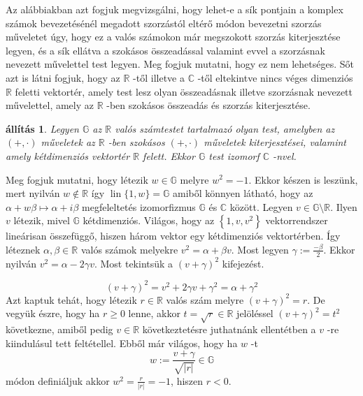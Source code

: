\documentclass[9pt, showtrims]{memoir}
\makeatletter
\renewenvironment{proof}[1][\proofname]
    {\par\pushQED{\qed}%
    \normalfont \topsep6\p@\@plus6\p@\relax
    \trivlist
    \item[\hskip\labelsep
        \itshape
    #1\@addpunct{:}]\ignorespaces}
    {\popQED\endtrivlist\@endpefalse}
\theoremstyle{plain}
\newtheorem{proposition}{állítás}[section]
\theoremstyle{remark}
\theoremstyle{definition}
\makeatother
\begin{document}
Az alábbiakban azt fogjuk megvizsgálni, hogy lehet-e a sík pontjain
a komplex számok bevezetésénél megadott szorzástól eltérő
módon bevezetni szorzás műveletet úgy, hogy ez a valós számokon
már megszokott szorzás kiterjesztése legyen, és a sík ellátva
a szokásos összeadással valamint evvel a szorzásnak nevezett művelettel test legyen.
Meg fogjuk mutatni, hogy ez nem lehetséges.
Sőt
azt is látni fogjuk, hogy az $\mathbb{R}$ -től illetve a $\mathbb{C}$ -től
eltekintve nincs véges dimenziós $\mathbb{R}$ feletti vektortér, amely
test lesz olyan összeadásnak illetve szorzásnak nevezett művelettel, 
amely az $\mathbb{R}$ -ben szokásos összeadás és szorzás kiterjesztése.

\begin{proposition}
\label{Th:CUnique1}Legyen $\mathbb{G}$ az $\mathbb{R}$ valós számtestet
tartalmazó olyan test, amelyben az $\left( +,\cdot \right) $ műveletek az $\mathbb{R}$ -ben szokásos $\left( +,\cdot \right) $ műveletek kiterjesztései, valamint amely kétdimenziós vektortér $\mathbb{R}$ felett.
Ekkor $\mathbb{G}$ test izomorf $\mathbb{C}$ -nvel.
\end{proposition}

\begin{proof}
Meg fogjuk mutatni, hogy létezik $w\in \mathbb{G}$ melyre $w^{2}=-1$.
Ekkor
készen is leszünk, mert nyilván $w\notin \mathbb{R}$ így $\operatorname{lin}\{1,w\}=\mathbb{G}$ amiből könnyen látható, hogy
az $\alpha +w\beta \longmapsto \alpha +i\beta $ megfeleltetés
izomorfizmus $\mathbb{G}$ és $\mathbb{C}$ között.
\newline
Legyen $v\in \mathbb{G}\setminus \mathbb{R}$.
Ilyen $v$ létezik, mivel $\mathbb{G}
$ kétdimenziós.
Világos, hogy az $\left\{
1,v,v^{2}\right\} $ vektorrendszer lineárisan összefüggő,
hiszen három vektor egy kétdimenziós vektortérben.
\'{I}gy léteznek $\alpha ,\beta \in \mathbb{R}$ valós számok melyekre $v^{2}=\alpha +\beta v$.
Most legyen $\gamma :=\frac{-\beta }{2}
$.
Ekkor nyilván $v^{2}=\alpha -2\gamma v$.
Most tekintsük a $\left(
v+\gamma \right) ^{2}$ kifejezést.

\[
\left( v+\gamma \right) ^{2}=v^{2}+2\gamma v+\gamma ^{2}=\alpha +\gamma ^{2}
\]
Azt kaptuk tehát, hogy létezik $r\in \mathbb{R}$ valós szám
melyre $\left( v+\gamma \right) ^{2}=r$.
De vegyük észre, hogy ha $r\geq 0$ lenne, 
akkor $t=\sqrt{r}\in\mathbb{R}$
jelöléssel $\left( v+\gamma \right)^2=t^2$ következne, amiből pedig $v\in \mathbb{R}$ következtetésre juthatnánk ellentétben a $v$ -re kiindulásul tett feltétellel.
Ebből már
világos, hogy ha $w$ -t 
\[
w:=\frac{v+\gamma }{\sqrt{\left| r\right| }}\in \mathbb{G}
\]
módon definiáljuk akkor $w^{2}=\frac{r}{\left| r\right| }=-1$,
hiszen $r<0$.
\end{proof}
\end{document}

